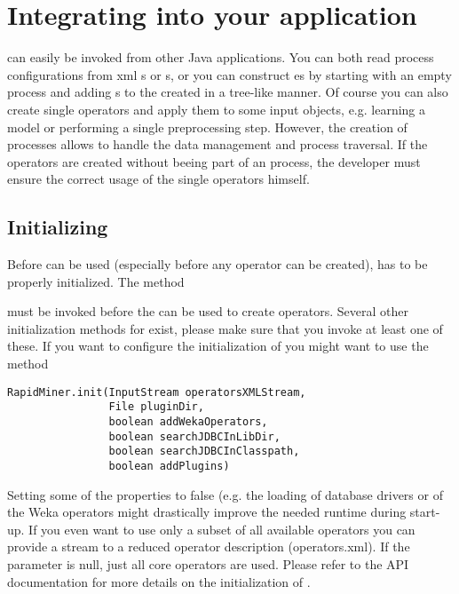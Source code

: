 \chapter{Integrating \rapidminer into your application}
\label{sec:integrating_rapidminer}

\rapidminer can easily be invoked from other Java applications. 
You can both read process configurations from xml
s or s, or you can construct es
by starting with an empty process and adding s
to the created  in a tree-like manner. Of course you can also
create single operators and apply them to some input objects, e.g. learning a
model or performing a single preprocessing step. However, the creation of
processes allows \rapidminer to handle the data management and process
traversal. If the operators are created without beeing part of an process,
the developer must ensure the correct usage of the single operators himself.


\section{Initializing \rapidminer}

Before \rapidminer can be used (especially before any operator can be created),
\rapidminer has to be properly initialized.
The method 
\begin{center}
\end{center}
must be invoked before the  can be used to create operators. 
Several other initialization methods for \rapidminer exist, please make sure that you 
invoke at least one of these. If you want to configure the initialization of \rapidminer
you might want to use the method
\begin{center}
\begin{verbatim}
RapidMiner.init(InputStream operatorsXMLStream, 
			    File pluginDir, 
			    boolean addWekaOperators, 
			    boolean searchJDBCInLibDir, 
			    boolean searchJDBCInClasspath, 
			    boolean addPlugins)
\end{verbatim}
\end{center}
Setting some of the properties to false (e.g. the loading of database drivers or of 
the Weka operators might drastically improve the needed runtime during start-up. 
If you even want to use only a subset of all available operators you can provide a 
stream to a reduced operator description (operators.xml). If the parameter
 is null, just all core operators are used. Please
refer to the API documentation for more details on the initialization of \rapidminer.

